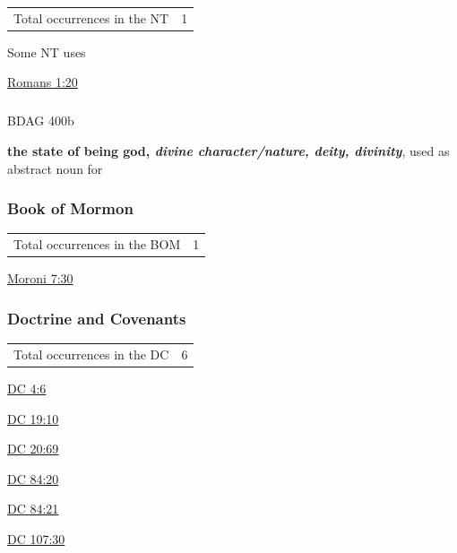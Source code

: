 				\begin{tabular}{ll}
					Total occurrences in the NT & 1
				\end{tabular}
				
				\begin{compactdesc}
					\item[Some NT uses] \textbf{}
						\begin{compactdesc}
							\item[{\hyperref[ROMANS-1-20]{Romans 1:20}}]
						\end{compactdesc}
				\end{compactdesc}
				
			\subparagraph{\texorpdfstring{\gr{θεότης}}{}}
				\label{THEOTES}
			
				\begin{compactdesc}
					\item[BDAG 400b] \textbf{}
						\begin{compactitem}
							\item \textbf{the state of being god, \textit{divine character/nature, deity, divinity}}, used as abstract noun for \gr{θεός}
						\end{compactitem}
				\end{compactdesc}
		
	\subsubsection{Book of Mormon} %
		\label{GODLINESS-BOM}
	
		\begin{tabular}{ll}
			Total occurrences in the BOM & 1
		\end{tabular}
		
		\begin{compactdesc}
			\item[{\hyperref[MORONI-7-30]{Moroni 7:30}}]
		\end{compactdesc}
		
	\subsubsection{Doctrine and Covenants} %
		\label{GODLINESS-DC}
	
		\begin{tabular}{ll}
			Total occurrences in the DC & 6
		\end{tabular}
		
		\begin{compactdesc}
			\item[{\hyperref[DC4-6]{DC 4:6}}]
			\item[{\hyperref[DC19-10]{DC 19:10}}]
			\item[{\hyperref[DC20-69]{DC 20:69}}]
			\item[{\hyperref[DC84-20]{DC 84:20}}] 
			\item[{\hyperref[DC84-21]{DC 84:21}}] 
			\item[{\hyperref[DC107-30]{DC 107:30}}]
		\end{compactdesc}
		
